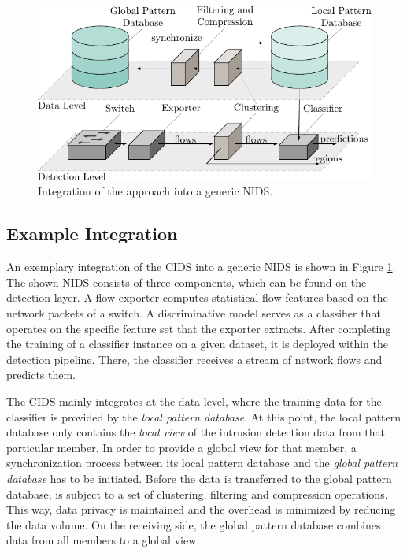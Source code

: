 \begin{figure}[t!]
    \centering
    \includegraphics[width=0.8\linewidth]{tikz/high_level_architecture.pdf}
    \caption{Integration of the approach into a generic NIDS.}
    \label{fig:high_level_architecture}
\end{figure}



\subsection{Example Integration}\label{subsec:example_integration}
An exemplary integration of the CIDS into a generic NIDS is shown in Figure \ref{fig:high_level_architecture}. The shown NIDS consists of three components, which can be found on the detection layer. A flow exporter computes statistical flow features based on the network packets of a switch. A discriminative model serves as a classifier that operates on the specific feature set that the exporter extracts. After completing the training of a classifier instance on a given dataset, it is deployed within the detection pipeline. There, the classifier receives a stream of network flows and predicts them.

The CIDS mainly integrates at the data level, where the training data for the classifier is provided by the \textit{local pattern database}. At this point, the local pattern database only contains the \textit{local view} of the intrusion detection data from that particular member. In order to provide a global view for that member, a synchronization process between its local pattern database and the \textit{global pattern database} has to be initiated. Before the data is transferred to the global pattern database, is subject to a set of clustering, filtering and compression operations. This way, data privacy is maintained and the overhead is minimized by reducing the data volume. On the receiving side, the global pattern database combines data from all members to a global view.


